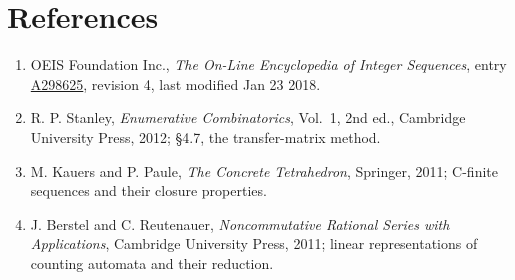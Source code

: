 \documentclass[11pt]{article}
\theoremstyle{definition}
\begin{document}
\section{References}

\begin{enumerate}

\item OEIS Foundation Inc., \emph{The On-Line Encyclopedia of Integer Sequences}, entry \href{https://oeis.org/A298625}{A298625}, revision 4, last modified Jan 23 2018.

\item R. P. Stanley, \emph{Enumerative Combinatorics}, Vol.~1, 2nd ed., Cambridge University Press, 2012; \S4.7, the transfer-matrix method.

\item M. Kauers and P. Paule, \emph{The Concrete Tetrahedron}, Springer, 2011; C-finite sequences and their closure properties.

\item J. Berstel and C. Reutenauer, \emph{Noncommutative Rational Series with Applications}, Cambridge University Press, 2011; linear representations of counting automata and their reduction.

\end{enumerate}
\end{document}
